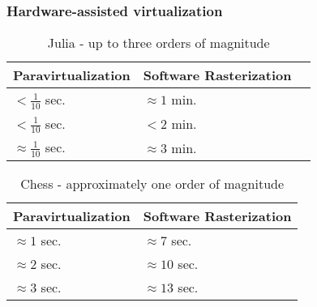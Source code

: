 \begin{frame}
\frametitle{Hardware-assisted virtualization}

\begin{table}[]
\centering
\caption{Julia - up to three orders of magnitude}
\begin{tabular}{lll}
\hline
Paravirtualization & Software Rasterization \\ \hline
$<\frac{1}{10}$ sec. & $\approx 1$ min. \\
$<\frac{1}{10}$ sec. & $<2$ min. \\
$\approx \frac{1}{10}$ sec. & $\approx 3$ min. \\ \hline
\end{tabular}
\end{table}

\begin{table}[]
\centering
\caption{Chess - approximately one order of magnitude}
\begin{tabular}{ll}
\hline
Paravirtualization & Software Rasterization \\ \hline
$\approx 1$ sec. & $\approx 7$ sec. \\
$\approx 2$ sec. & $\approx 10$ sec. \\
$\approx 3$ sec. & $\approx 13$ sec. \\ \hline
\end{tabular}
\end{table}


\end{frame}
